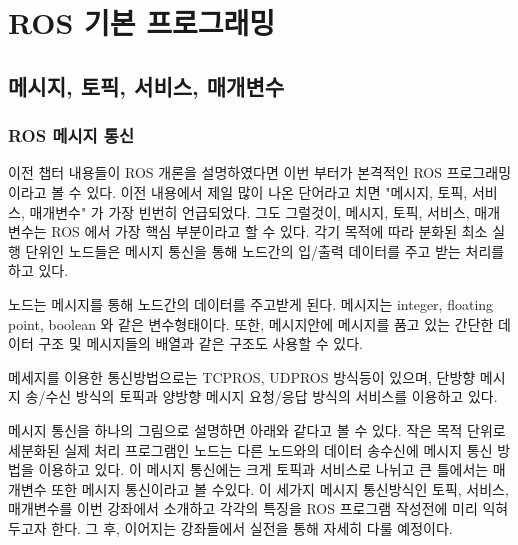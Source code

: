 
\chapter{ROS 기본 프로그래밍}
\label{cha:RosPrograming}

\section{메시지, 토픽, 서비스, 매개변수}

\subsection{ROS 메시지 통신}

이전 챕터 내용들이 ROS 개론을 설명하였다면 이번 부터가 본격적인 ROS 프로그래밍이라고 볼 수 있다. 이전 내용에서 제일 많이 나온 단어라고 치면 "메시지, 토픽, 서비스, 매개변수" 가 가장 빈번히 언급되었다. 그도 그럴것이, 메시지, 토픽, 서비스, 매개변수는 ROS 에서 가장 핵심 부분이라고 할 수 있다. 각기 목적에 따라 분화된 최소 실행 단위인 노드들은 메시지 통신을 통해 노드간의 입/출력 데이터를 주고 받는 처리를 하고 있다.

\begin{definition*}
노드는 메시지를 통해 노드간의 데이터를 주고받게 된다. 메시지는 integer, floating point, boolean 와 같은 변수형태이다. 또한, 메시지안에 메시지를 품고 있는 간단한 데이터 구조 및 메시지들의 배열과 같은 구조도 사용할 수 있다. 

메세지를 이용한 통신방법으로는 TCPROS, UDPROS 방식등이 있으며, 단방향 메시지 송/수신 방식의 토픽과 양방향 메시지 요청/응답 방식의 서비스를 이용하고 있다.
\end{definition*}

메시지 통신을 하나의 그림으로 설명하면 아래와 같다고 볼 수 있다. 작은 목적 단위로 세분화된 실제 처리 프로그램인 노드는 다른 노드와의 데이터 송수신에 메시지 통신 방법을 이용하고 있다. 이 메시지 통신에는 크게 토픽과 서비스로 나뉘고 큰 틀에서는 매개변수 또한 메시지 통신이라고 볼 수있다. 이 세가지 메시지 통신방식인 토픽, 서비스, 매개변수를 이번 강좌에서 소개하고 각각의 특징을 ROS 프로그램 작성전에 미리 익혀두고자 한다. 그 후, 이어지는 강좌들에서 실전을 통해 자세히 다룰 예정이다.

